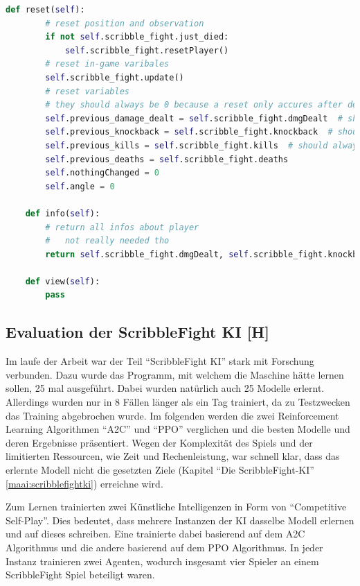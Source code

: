 \begin{lstlisting}[language=Python,firstnumber=182]
    def reset(self):
        # reset position and observation
        if not self.scribble_fight.just_died:
            self.scribble_fight.resetPlayer()
        # reset in-game varibales
        self.scribble_fight.update()
        # reset variables
        # they should always be 0 because a reset only accures after death or as initialisation
        self.previous_damage_dealt = self.scribble_fight.dmgDealt  # should always be 0
        self.previous_knockback = self.scribble_fight.knockback  # should always be 1
        self.previous_kills = self.scribble_fight.kills  # should always be 0
        self.previous_deaths = self.scribble_fight.deaths
        self.nothingChanged = 0
        self.angle = 0

    def info(self):
        # return all infos about player
        #   not really needed tho
        return self.scribble_fight.dmgDealt, self.scribble_fight.knockback, self.scribble_fight.kills, self.scribble_fight.deaths

    def view(self):
        pass

\end{lstlisting}

\subsection{Evaluation der ScribbleFight KI [H]}

Im laufe der Arbeit war der Teil ``ScribbleFight KI'' stark mit Forschung verbunden. Dazu wurde das Programm,
mit welchem die Maschine hätte lernen sollen, 25 mal ausgeführt. Dabei wurden natürlich auch 25 Modelle erlernt.
Allerdings wurden nur in 8 Fällen länger als ein Tag trainiert, da zu Testzwecken das Training abgebrochen wurde.
Im folgenden werden die zwei Reinforcement Learning Algorithmen ``A2C'' und ``PPO'' verglichen und die besten Modelle
und deren Ergebnisse präsentiert. Wegen der Komplexität des Spiels und der limitierten Ressourcen, wie Zeit und Rechenleistung,
war schnell klar, dass das erlernte Modell nicht die gesetzten Ziele (Kapitel ``Die ScribbleFight-KI'' \ref{maai:scribblefightki}) erreichne wird.

Zum Lernen trainierten zwei Künstliche Intelligenzen in Form von ``Competitive Self-Play''. Dies bedeutet,
dass mehrere Instanzen der KI dasselbe Modell erlernen und auf dieses schreiben. Eine trainierte dabei basierend auf dem
A2C Algorithmus und die andere basierend auf dem PPO Algorithmus. In jeder Instanz trainieren zwei Agenten,
wodurch insgesamt vier Spieler an einem ScribbleFight Spiel beteiligt waren.

